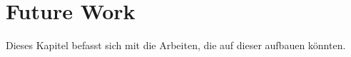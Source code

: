 \chapter{Future Work}
Dieses Kapitel befasst sich mit die Arbeiten, die auf dieser aufbauen könnten.